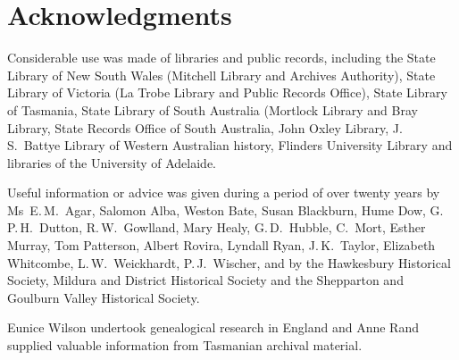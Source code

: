 
\chapter{Acknowledgments}
\label{ch:ack}

Considerable use was made of libraries and public records, including
the State Library of New South Wales (Mitchell Library and Archives
Authority), State Library of Victoria (La Trobe Library and Public
Records Office), State Library of Tasmania, State Library of South
Australia (Mortlock Library and Bray Library, State Records Office of
South Australia, John Oxley Library, J.\,S.~Battye Library of Western
Australian history, Flinders University Library and libraries of the
University of Adelaide.

Useful information or advice was given during a period of over
twenty years by Ms~E.\,M.~Agar, Salomon Alba, Weston Bate, Susan
Blackburn, Hume Dow, G.\,P.\,H.~Dutton, R.\,W.~Gowlland, Mary Healy,
G.\,D.~Hubble, C.~Mort, Esther Murray, Tom Patterson, Albert Rovira,
Lyndall Ryan, J.\,K.~Taylor, Elizabeth Whitcombe, L.\,W.~Weickhardt,
P.\,J.~Wischer, and by the Hawkesbury Historical Society, Mildura and
District Historical Society and the Shepparton and Goulburn Valley
Historical Society.

Eunice Wilson undertook genealogical research in England and Anne Rand
supplied valuable information from Tasmanian archival material.
